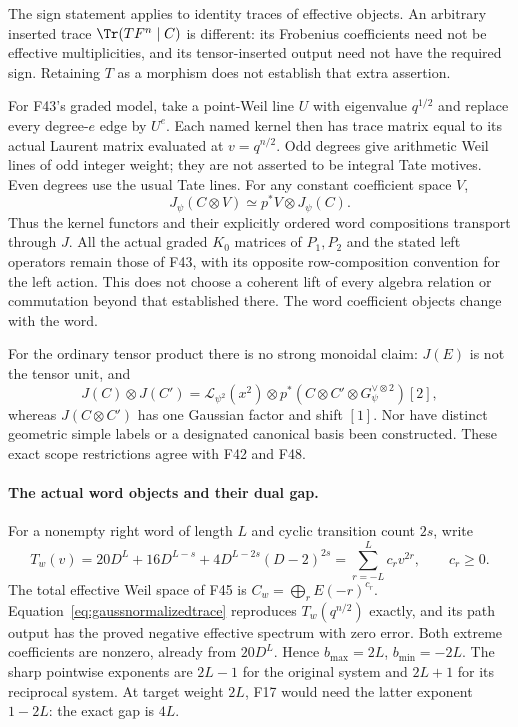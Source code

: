 \documentclass[11pt,a4paper]{article}
\newcommand{\fid}[1]{\textsf{#1}}\newcommand{\gate}[1]{\textsf{#1}}
\theoremstyle{named}\newtheorem{finding}{Finding}[section]
\theoremstyle{definition}\newtheorem{definition}[finding]{Definition}
\theoremstyle{remark}\newtheorem{remark}[finding]{Remark}
\begin{document}
The sign statement applies to identity traces of effective
objects. An arbitrary inserted trace $\Tr(TF^n\mid C)$ is
different: its Frobenius coefficients need not be effective
multiplicities, and its tensor-inserted output need not have
the required sign. Retaining $T$ as a morphism does not
establish that extra assertion.

For \fid{F43}'s graded model, take a point-Weil line $U$
with eigenvalue $q^{1/2}$ and replace every degree-$e$
edge by $U^e$. Each named kernel then has trace matrix
equal to its actual Laurent matrix evaluated at
$v=q^{n/2}$. Odd degrees give arithmetic Weil lines of
odd integer weight; they are not asserted to be integral Tate
motives. Even degrees use the usual Tate lines.
For any constant coefficient space $V$,
\[
 J_\psi(C\otimes V)\simeq p^*V\otimes J_\psi(C).
\]
Thus the kernel functors and their explicitly ordered
word compositions transport through $J$. All the actual
graded $K_0$ matrices of $P_1,P_2$ and the stated left
operators remain those of \fid{F43}, with its opposite
row-composition convention for the left action.
This does not choose a coherent lift of every algebra
relation or commutation beyond that established there.
The word coefficient objects change with the word.

For the ordinary tensor product there is no strong monoidal claim:
$J(E)$ is not the tensor unit, and
\[
 J(C)\otimes J(C')
 =\mathcal L_{\psi^2}(x^2)\otimes
     p^*(C\otimes C'\otimes G_\psi^{\vee\otimes2})[2],
\]
whereas $J(C\otimes C')$ has one Gaussian factor and
shift $[1]$. Nor have distinct geometric simple labels
or a designated canonical basis been constructed.
These exact scope restrictions agree with \fid{F42}
and \fid{F48}.

\paragraph{The actual word objects and their dual gap.}
For a nonempty right word of length $L$ and cyclic
transition count $2s$, write
\[
 T_w(v)=20D^L+16D^{L-s}
          +4D^{L-2s}(D-2)^{2s}
       =\sum_{r=-L}^{L}c_rv^{2r},\qquad c_r\ge0.
\]
The total effective Weil space of \fid{F45} is
$C_w=\bigoplus_r E(-r)^{c_r}$.
Equation~\eqref{eq:gaussnormalizedtrace} reproduces
$T_w(q^{n/2})$ exactly, and its path output has the
proved negative effective spectrum with zero error.
Both extreme coefficients are nonzero, already from
$20D^L$. Hence $b_{\max}=2L$, $b_{\min}=-2L$.
The sharp pointwise exponents are $2L-1$ for the original
system and $2L+1$ for its reciprocal system. At target
weight $2L$, \fid{F17} would need the latter exponent
$1-2L$: the exact gap is $4L$.
\end{document}

